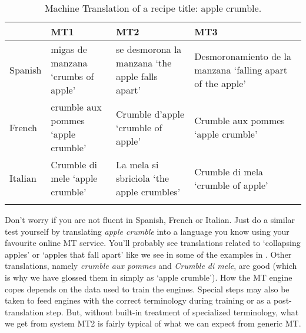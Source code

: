 \documentclass[output=paper]{langscibook}
\begin{document}
\begin{table}
\caption{Machine Translation of a recipe title: apple crumble.}
\label{tab:1:apple}
\begin{tabularx}{\textwidth}{
p{}
p{}
p{}
p{}} \lsptoprule
 & {MT1} & {MT2} & {MT3} \\\midrule 
{Spanish} & migas \newline de manzana \newline `crumbs of \newline apple' & se desmorona \newline la manzana \newline `the apple \newline falls apart' & Desmoronamiento \newline de la manzana \newline `falling apart of \newline the apple' \\\midrule
{French} & crumble \newline aux pommes  \newline `apple crumble' & Crumble \newline d’apple  \newline `crumble of apple' & Crumble \newline aux pommes \newline `apple crumble'\\ \midrule
{Italian} & Crumble \newline di mele \newline `apple \newline crumble' & La mela \newline si sbriciola \newline `the apple \newline crumbles' & Crumble \newline di mela \newline `crumble \newline of apple' \\\lspbottomrule 
\end{tabularx}
\end{table}


Don't worry if you are not fluent in Spanish, French or Italian. Just do a similar test yourself by translating \textit{apple crumble} into a language you know using your favourite online MT service. You’ll probably see translations related to `collapsing apples' or `apples that fall apart' like we see in some of the examples in . Other translations, namely \textit{crumble aux pommes} and \textit{Crumble di mele},  are good (which is why we have glossed them in  simply as `apple crumble'). How the MT engine copes depends on the data used to train the engines. Special steps may also be taken to feed engines with the correct terminology during training or as a post-translation step. But, without built-in treatment of specialized terminology, what we get from system MT2 is fairly typical of what we can expect from generic MT. 
\end{document}
